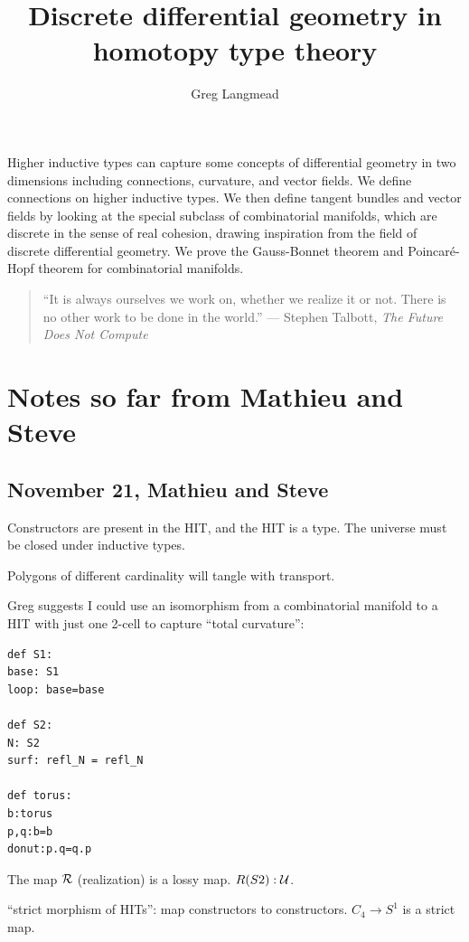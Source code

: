 \documentclass[12pt,fleqn]{article}
\title{Discrete differential geometry in homotopy type theory}
\author{Greg Langmead}
\renewenvironment{abstract}{\section*{\abstractname}}{}
\begin{document}
\maketitle

\begin{abstract}
Higher inductive types can capture some concepts of differential geometry in two dimensions including connections, curvature, and vector fields. We define connections on higher inductive types. We then define tangent bundles and vector fields by looking at the special subclass of combinatorial manifolds, which are discrete in the sense of real cohesion\cite{shulman_cohesion}, drawing inspiration from the field of discrete differential geometry. We prove the Gauss-Bonnet theorem and Poincaré-Hopf theorem for combinatorial manifolds.
\end{abstract}

\begin{quote} 
\centering
``It is always ourselves we work on, whether we realize it or not. There is no other work to be done in the world.'' --- Stephen Talbott, \emph{The Future Does Not Compute}\cite{talbott}
\end{quote}

\section*{Notes so far from Mathieu and Steve}
\subsection{November 21, Mathieu and Steve}
Constructors are present in the HIT, and the HIT is a type. The universe must be closed under inductive types.

Polygons of different cardinality will tangle with transport.

Greg suggests I could use an isomorphism from a combinatorial manifold to a HIT with just one 2-cell to capture ``total curvature'':

\begin{verbatim}
def S1:
base: S1
loop: base=base

def S2:
N: S2
surf: refl_N = refl_N

def torus:
b:torus
p,q:b=b
donut:p.q=q.p
\end{verbatim}

The map \( \mathcal{R} \) (realization) is a lossy map. \( R(S2):\mathcal{U}  \).

``strict morphism of HITs'': map constructors to constructors. \( C_4\to S^1 \) is a strict map.
\end{document}
